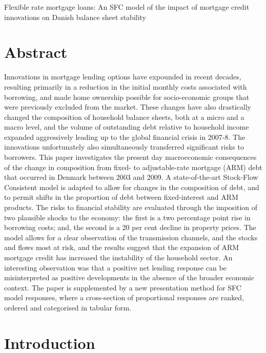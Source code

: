 \documentclass[
]{book}
\begin{document}
Flexible rate mortgage loans: An SFC model of the impact of mortgage credit innovations on Danish balance sheet stability

\hypertarget{abstract}{%
\section*{Abstract}\label{abstract}}

Innovations in mortgage lending options have expounded in recent decades, resulting primarily in a reduction in the initial monthly costs associated with borrowing, and made home ownership possible for socio-economic groups that were previously excluded from the market. These changes have also drastically changed the composition of household balance sheets, both at a micro and a macro level, and the volume of outstanding debt relative to household income expanded aggressively leading up to the global financial crisis in 2007-8. The innovations unfortunately also simultaneously transferred significant risks to borrowers. This paper investigates the present day macroeconomic consequences of the change in composition from fixed- to adjustable-rate mortgage (ARM) debt that occurred in Denmark between 2003 and 2009. A state-of-the-art Stock-Flow Consistent model is adapted to allow for changes in the composition of debt, and to permit shifts in the proportion of debt between fixed-interest and ARM products. The risks to financial stability are evaluated through the imposition of two plausible shocks to the economy: the first is a two percentage point rise in borrowing costs; and, the second is a 20 per cent decline in property prices. The model allows for a clear observation of the transmission channels, and the stocks and flows most at risk, and the results suggest that the expansion of ARM mortgage credit has increased the instability of the household sector. An interesting observation was that a positive net lending response can be misinterpreted as positive developments in the absence of the broader economic context. The paper is supplemented by a new presentation method for SFC model responses, where a cross-section of proportional responses are ranked, ordered and categorised in tabular form.

\hypertarget{sec:fi-fl-sfc-intro}{%
\section{Introduction}\label{sec:fi-fl-sfc-intro}}
\end{document}
